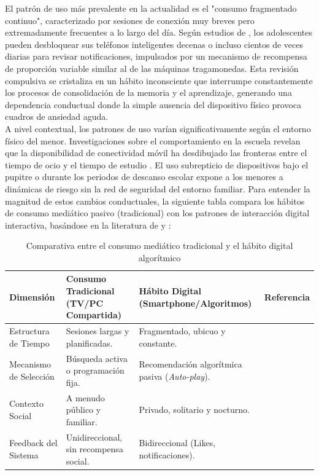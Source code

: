 El patrón de uso más prevalente en la actualidad es el "consumo fragmentado continuo", caracterizado por sesiones de conexión muy breves pero extremadamente frecuentes a lo largo del día. Según estudios de \cite{serra_smartphone_2021}, los adolescentes pueden desbloquear sus teléfonos inteligentes decenas o incluso cientos de veces diarias para revisar notificaciones, impulsados por un mecanismo de recompensa de proporción variable similar al de las máquinas tragamonedas. Esta revisión compulsiva se cristaliza en un hábito inconsciente que interrumpe constantemente los procesos de consolidación de la memoria y el aprendizaje, generando una dependencia conductual donde la simple ausencia del dispositivo físico provoca cuadros de ansiedad aguda.\\



A nivel contextual, los patrones de uso varían significativamente según el entorno físico del menor. Investigaciones sobre el comportamiento en la escuela revelan que la disponibilidad de conectividad móvil ha desdibujado las fronteras entre el tiempo de ocio y el tiempo de estudio \cite{kopecky_behaviour_2021}. El uso subrepticio de dispositivos bajo el pupitre o durante los periodos de descanso escolar expone a los menores a dinámicas de riesgo sin la red de seguridad del entorno familiar. Para entender la magnitud de estos cambios conductuales, la siguiente tabla compara los hábitos de consumo mediático pasivo (tradicional) con los patrones de interacción digital interactiva, basándose en la literatura de \cite{bohnert_emerging_2021} y \cite{selak_problematic_2025}:

\begin{table}[h!]
\centering
\caption{Comparativa entre el consumo mediático tradicional y el hábito digital algorítmico}
\begin{tabular}{|p{3cm}|p{4.5cm}|p{4.5cm}|p{2cm}|}
\hline
\textbf{Dimensión} & \textbf{Consumo Tradicional (TV/PC Compartida)} & \textbf{Hábito Digital (Smartphone/Algoritmos)} & \textbf{Referencia} \\ \hline
Estructura de Tiempo & Sesiones largas y planificadas. & Fragmentado, ubicuo y constante. & \cite{serra_smartphone_2021} \\ \hline
Mecanismo de Selección & Búsqueda activa o programación fija. & Recomendación algorítmica pasiva (\textit{Auto-play}). & \cite{selak_problematic_2025} \\ \hline
Contexto Social & A menudo público y familiar. & Privado, solitario y nocturno. & \cite{bohnert_emerging_2021} \\ \hline
Feedback del Sistema & Unidireccional, sin recompensa social. & Bidireccional (Likes, notificaciones). & \cite{kopecky_behaviour_2021} \\ \hline
\end{tabular}
\end{table}

